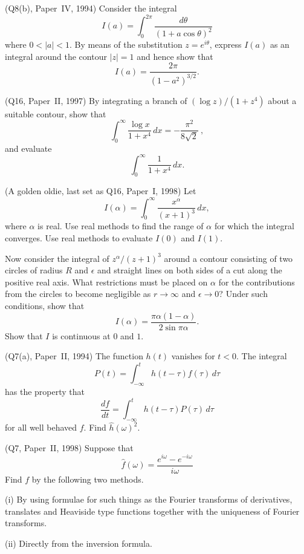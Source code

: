 \begin{question} (Q8(b), Paper~IV, 1994) Consider
the integral
\[I(a)=\int_{0}^{2\pi}\frac{d\theta}{(1+a\cos\theta)^{2}}\]
where $0<|a|<1$. By means of the substitution $z=e^{i\theta}$,
express $I(a)$ as an integral around the contour
$|z|=1$ and hence show that
\[I(a)=\frac{2\pi}{(1-a^{2})^{3/2}}.\]

\end{question}
\begin{question} (Q16, Paper~II, 1997)
By integrating a branch of $(\log z)/(1+z^{4})$ 
about a suitable contour, show that
\[\int_{0}^{\infty}\frac{\log x}{1+x^{4}}\,dx
=-\frac{\pi^{2}}{8\sqrt{2}}\ ,\]
and evaluate
\[\int_{0}^{\infty}\frac{1}{1+x^{4}}\,dx.\]
\end{question}
\begin{question} (A golden oldie, last set as Q16, Paper~I, 1998)
Let
\[I(\alpha)=\int_{0}^{\infty}\frac{x^{\alpha}}{(x+1)^{3}}\,dx,\]
where $\alpha$ is real.
Use real methods to find the range of $\alpha$ for which the integral
converges. Use real methods to evaluate $I(0)$ and $I(1)$.

Now consider the integral of $z^{\alpha}/(z+1)^{3}$ around
a contour consisting of two circles of radius $R$ and $\epsilon$ and
straight lines on both sides of a cut along the positive
real axis. What restrictions must be placed on $\alpha$
for the contributions from the circles to become negligible
as $r\rightarrow\infty$ and $\epsilon\rightarrow 0$?
Under such conditions, show that
\[I(\alpha)=\frac{\pi\alpha(1-\alpha)}{2\sin\pi\alpha}.\]
Show that $I$ is continuous at $0$ and $1$.
\end{question}
\begin{question} (Q7(a), Paper~II, 1994) The
function $h(t)$ vanishes for $t<0$. The integral
\[P(t)=\int_{-\infty}^{t}h(t-\tau)f(\tau)\,d\tau\]
has the property that
\[\frac{df}{dt}=\int_{-\infty}^{t}h(t-\tau)P(\tau)\,d\tau\] 
for all well behaved $f$.
Find $\hat{h}(\omega)^{2}$.
\end{question}
\begin{question} (Q7, Paper~II, 1998)
Suppose that
\[\hat{f}(\omega)=\frac{e^{i\omega}-e^{-i\omega}}{i\omega}\]
Find $f$ by the following two methods.

(i) By using formulae for such things as the Fourier
transforms of derivatives, translates
and Heaviside type functions
together with the uniqueness of Fourier transforms.

(ii) Directly from the inversion formula.

\end{question}
